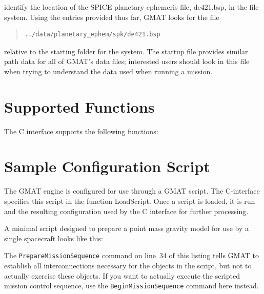 \documentclass[letterpaper,10pt]{article}
\begin{document}
\noindent identify the location of the SPICE planetary ephemeris file, de421.bsp, in the file system.  Using the entries provided thus far, GMAT looks for the file

\begin{quote}
\begin{verbatim}
../data/planetary_ephem/spk/de421.bsp
\end{verbatim}
\end{quote}

\noindent relative to the starting folder for the system.  The startup file provides similar path data for all of GMAT's data files; interested users should look in this file when trying to understand the data used when running a mission.

\section{\label{sec:FunctionList}Supported Functions}

The C interface supports the following functions:

\begin{quote}

\end{quote} 

\section{\label{sec:SampleConfigurationScript}Sample Configuration Script}

The GMAT engine is configured for use through a GMAT script.  The C-interface specifies this script in the function LoadScript.  Once a script is loaded, it is run and the resulting configuration used by the C interface for further processing.  

A minimal script designed to prepare a point mass gravity model for use by a single spacecraft looks like this:

\begin{quote}
\lstset{numbers=left}

\end{quote}

\noindent The \texttt{PrepareMissionSequence} command on line~34 of this listing tells GMAT to establish all interconnections necessary for the objects in the script, but not to actually exercise these objects.  If you want to actually execute the scripted mission control sequence, use the \texttt{BeginMissionSequence} command here instead.
\end{document}
